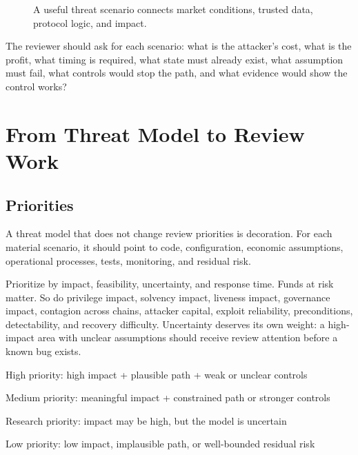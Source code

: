 \begin{figure}[htbp]
\centering
{}
\caption{A useful threat scenario connects market conditions, trusted data, protocol logic, and impact.}
\end{figure}

The reviewer should ask for each scenario: what is the attacker's cost, what is the profit, what timing is required, what state must already exist, what assumption must fail, what controls would stop the path, and what evidence would show the control works?

\section{From Threat Model to Review Work}

\subsection{Priorities}

A threat model that does not change review priorities is decoration. For each material scenario, it should point to code, configuration, economic assumptions, operational processes, tests, monitoring, and residual risk.

Prioritize by impact, feasibility, uncertainty, and response time. Funds at risk matter. So do privilege impact, solvency impact, liveness impact, governance impact, contagion across chains, attacker capital, exploit reliability, preconditions, detectability, and recovery difficulty. Uncertainty deserves its own weight: a high-impact area with unclear assumptions should receive review attention before a known bug exists.

\begin{codeblock}
High priority:
    high impact + plausible path + weak or unclear controls

Medium priority:
    meaningful impact + constrained path or stronger controls

Research priority:
    impact may be high, but the model is uncertain

Low priority:
    low impact, implausible path, or well-bounded residual risk
\end{codeblock}

